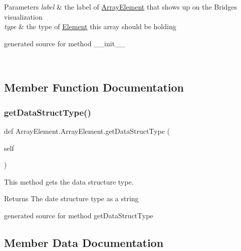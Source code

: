\begin{DoxyParams}{Parameters}
{\em label} & the label of \hyperlink{class_array_element_1_1_array_element}{Array\+Element} that shows up on the Bridges visualization \\
\hline
{\em type} & the type of \hyperlink{namespace_element}{Element} this array should be holding\begin{DoxyVerb}generated source for method __init__ \end{DoxyVerb}
 \\
\hline
\end{DoxyParams}


\subsection{Member Function Documentation}
\hypertarget{class_array_element_1_1_array_element_a268f5beb2259a5e0773017efb378485c}{}\label{class_array_element_1_1_array_element_a268f5beb2259a5e0773017efb378485c} 
\subsubsection{\texorpdfstring{get\+Data\+Struct\+Type()}{getDataStructType()}}
{\footnotesize\ttfamily def Array\+Element.\+Array\+Element.\+get\+Data\+Struct\+Type (\begin{DoxyParamCaption}\item[{}]{self }\end{DoxyParamCaption})}



This method gets the data structure type. 

\begin{DoxyReturn}{Returns}
The date structure type as a string\begin{DoxyVerb}generated source for method getDataStructType \end{DoxyVerb}
 
\end{DoxyReturn}


\subsection{Member Data Documentation}
\hypertarget{class_array_element_1_1_array_element_a52ac2ef65a0cfac9079a4ea0ad7b1ee0}{}\label{class_array_element_1_1_array_element_a52ac2ef65a0cfac9079a4ea0ad7b1ee0} 
